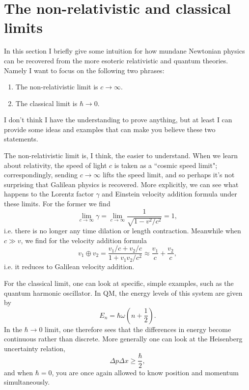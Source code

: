 \section{The non-relativistic and classical limits}

In this section I briefly give some intuition for how mundane Newtonian
physics can be recovered from the more esoteric relativistic and quantum
theories. Namely  I want to focus on 
the following two phrases:
\begin{enumerate}
  \item The non-relativistic limit is $c\to\infty$.
  \item The classical limit is $\hbar\to0$.
\end{enumerate}
I don't think I have the understanding to prove anything, but at least I
can provide some ideas and examples that can make you believe these
two statements.

The non-relativistic limit is, I think, the easier to understand. When we
learn about relativity, the speed of light $c$ is taken as a ``cosmic speed
limit"; correspondingly, sending $c\to\infty$ lifts the speed limit, and
so perhaps it's not surprising that Galilean physics is recovered.
More explicitly, we can see what happens to the Lorentz factor $\gamma$ and
Einstein velocity addition formula under these limits. For the former
we find
\begin{equation}
  \lim_{c\to\infty}\gamma
  =\lim_{c\to\infty}\frac{1}{\sqrt{1-v^2/c^2}}=1,
\end{equation}
i.e. there is no longer any time dilation or length contraction.
Meanwhile when $c\gg v$, we find for the velocity addition formula 
\begin{equation}
  v_1\oplus v_2
  =\frac{v_1/c + v_2/c}{1+v_1v_2/c^2}
  \approx \frac{v_1}{c} + \frac{v_2}{c}, 
\end{equation}
i.e. it reduces to Galilean velocity addition.

For the classical limit, one can look at specific, simple examples, such as
the quantum harmonic oscillator. In QM, the energy levels of this system
are given by
\begin{equation}
  E_n=\hbar\omega\left(n+\frac{1}{2}\right).
\end{equation}
In the $\hbar\to0$ limit, one therefore sees that the differences in energy
become continuous rather than discrete. More generally one can look at
the Heisenberg uncertainty relation,
\begin{equation}
  \Delta p\Delta x\geq \frac{\hbar}{2},
\end{equation}
and when $\hbar=0$, you are once again allowed to know position and
momentum simultaneously.

